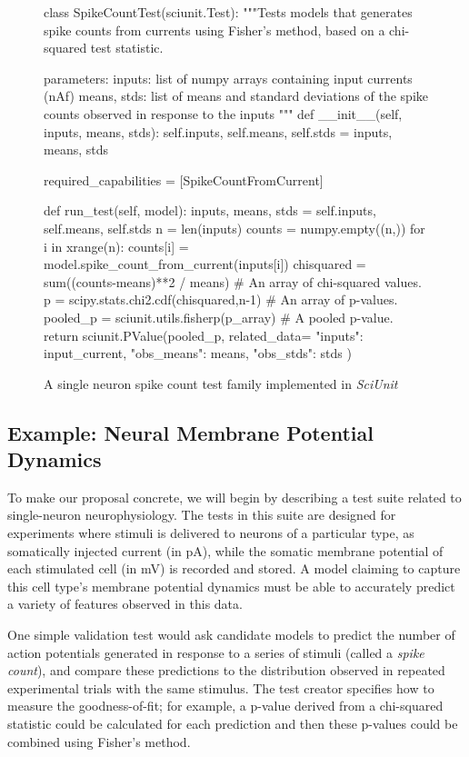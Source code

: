 \documentclass[11pt,letterpaper]{article}
\begin{document}
\begin{figure}
\small
\begin{python}
class SpikeCountTest(sciunit.Test):
  """Tests models that generates spike counts from currents using
  Fisher's method, based on a chi-squared test statistic.

  parameters:
    inputs: list of numpy arrays containing input currents (nAf)
    means, stds: list of means and standard deviations of the 
      spike counts observed in response to the inputs
  """
  def __init__(self, inputs, means, stds):
    self.inputs, self.means, self.stds = inputs, means, stds
	
  required_capabilities = [SpikeCountFromCurrent]
	
  def run_test(self, model):
    inputs, means, stds = self.inputs, self.means, self.stds
    n = len(inputs)
    counts = numpy.empty((n,))
    for i in xrange(n):
      counts[i] = model.spike_count_from_current(inputs[i])
    chisquared = sum((counts-means)**2 / means) # An array of chi-squared values.  
    p = scipy.stats.chi2.cdf(chisquared,n-1) # An array of p-values.  
    pooled_p = sciunit.utils.fisherp(p_array) # A pooled p-value.  
    return sciunit.PValue(pooled_p, related_data={
      "inputs": input_current,
      "obs_means": means,
      "obs_stds": stds
    })
\end{python}
\vspace{-5px}
\caption{A single neuron spike count test family implemented in \textit{SciUnit}}
\label{fig:rate_test}
\vspace{-15px}
\end{figure}
\subsection{Example: Neural Membrane Potential Dynamics} To make our proposal concrete, we will begin by describing a test suite related to single-neuron neurophysiology. The tests in this suite are designed for experiments where stimuli is delivered to neurons of a particular type, as somatically injected current (in pA), while the somatic membrane potential of each stimulated cell (in mV) is recorded and stored.  A model claiming to capture this cell type's membrane potential dynamics must be able to accurately predict a variety of features observed in this data.

One simple validation test would ask candidate models to predict the number of action potentials generated in response to a series of stimuli (called a \emph{spike count}), and compare these predictions to the distribution observed in repeated experimental trials with the same stimulus. The test creator specifies how to measure the goodness-of-fit; for example, a p-value derived from a chi-squared statistic could be calculated for each prediction and then these p-values could be combined using Fisher's method\cite{fisher_statistical_1925}.
\end{document}
